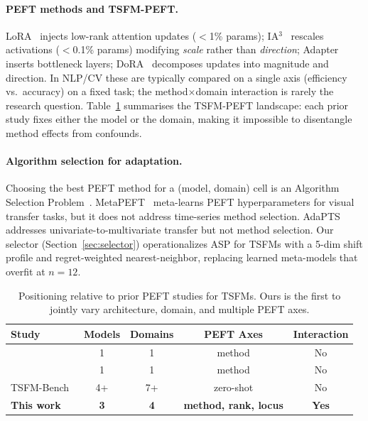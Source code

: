 \documentclass{article}
\begin{document}
\paragraph{PEFT methods and TSFM-PEFT.}
LoRA~\citep{hu2022lora} injects low-rank attention updates ($<$1\% params); IA$^3$~\citep{liu2022ia3} rescales activations ($<$0.1\% params) modifying \emph{scale} rather than \emph{direction}; Adapter~\citep{houlsby2019adapter} inserts bottleneck layers; DoRA~\citep{dora2024} decomposes updates into magnitude and direction. In NLP/CV these are typically compared on a single axis (efficiency vs.\ accuracy) on a fixed task; the method$\times$domain interaction is rarely the research question. Table~\ref{tab:positioning} summarises the TSFM-PEFT landscape: each prior study fixes either the model or the domain, making it impossible to disentangle method effects from confounds.

\paragraph{Algorithm selection for adaptation.}
Choosing the best PEFT method for a (model, domain) cell is an Algorithm Selection Problem~\citep{rice1976algorithm,bischl2016aslib}. MetaPEFT~\citep{tian2025metapeft} meta-learns PEFT hyperparameters for visual transfer tasks, but it does not address time-series method selection. AdaPTS~\citep{benechehab2025adapts} addresses univariate-to-multivariate transfer but not method selection. Our selector (Section~\ref{sec:selector}) operationalizes ASP for TSFMs with a 5-dim shift profile and regret-weighted nearest-neighbor, replacing learned meta-models that overfit at $n{=}12$.

\begin{table}[t]
\centering
\caption{Positioning relative to prior PEFT studies for TSFMs. Ours is the first to jointly vary architecture, domain, and multiple PEFT axes.}
\label{tab:positioning}
\small
\begin{tabular}{lcccc}
\toprule
Study & Models & Domains & PEFT Axes & Interaction \\
\midrule
\citet{gupta2024beyondlora} & 1 & 1 & method & No \\
\citet{park2026tsfm_adaptation} & 1 & 1 & method & No \\
TSFM-Bench~\citep{li2024tsfmbench} & 4+ & 7+ & zero-shot & No \\
\textbf{This work} & \textbf{3} & \textbf{4} & \textbf{method, rank, locus} & \textbf{Yes} \\
\bottomrule
\end{tabular}
\end{table}
\end{document}
